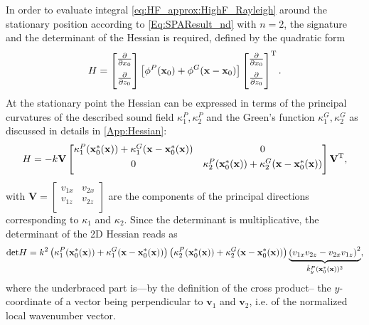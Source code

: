 In order to evaluate integral \eqref{eq:HF_approx:HighF_Rayleigh} around the stationary position according to \eqref{Eq:SPAResult_nd} with $n=2$, the signature and the determinant of the Hessian is required, defined by the quadratic form
\begin{equation}
H =
\begin{bmatrix} 
\frac{\partial}{\partial x_0}\\[.7em]
\frac{\partial}{\partial z_0}\\[0.5em] \end{bmatrix} 
\left[ \phi^P(\mathbf{x}_0) + \phi^G(\mathbf{x}-\mathbf{x}_0)  \right]
\begin{bmatrix} 
\frac{\partial}{\partial x_0}\\[.7em]
\frac{\partial}{\partial z_0} \\[0.5em] \end{bmatrix}^{\mathrm{T}}.
\end{equation}
At the stationary point the Hessian can be expressed in terms of the principal curvatures of the described sound field $\kappa_1^P, \kappa_2^P$ and the Green's function $\kappa_1^G, \kappa_2^G$ as discussed in details in \ref{App:Hessian}:
\begin{equation}
H = -k
\mathbf{V}
\begin{bmatrix} 
\kappa_1^P(\mathbf{x}_0^*(\mathbf{x})) + \kappa_1^G(\mathbf{x}-\mathbf{x}_0^*(\mathbf{x})) & 0 \\[.3em]
0 & \kappa_2^P(\mathbf{x}_0^*(\mathbf{x})) + \kappa_2^G(\mathbf{x}-\mathbf{x}_0^*(\mathbf{x})) \\[.5em] \end{bmatrix}
\mathbf{V}^{\mathrm{T}},
\end{equation}
with $\mathbf{V} = \begin{bmatrix} 
v_{1 x} & v_{2 x} \\[.1em]
v_{1 z} & v_{2 z}\\[.3em] \end{bmatrix}$ are the components of the principal directions corresponding to $\kappa_1$ and $\kappa_2$.
Since the determinant is multiplicative, the determinant of the 2D Hessian reads as
\begin{equation}
\mathrm{det} H = k^2
\left(\kappa_1^P(\mathbf{x}_0^*(\mathbf{x})) + \kappa_1^G(\mathbf{x}-\mathbf{x}_0^*(\mathbf{x}))\right)
\left(\kappa_2^P(\mathbf{x}_0^*(\mathbf{x})) + \kappa_2^G(\mathbf{x}-\mathbf{x}_0^*(\mathbf{x}))\right)
\underbrace{\left( v_{1 x}v_{2 z}-v_{2 x}v_{1 z} \right)^2}_{\hat{k}_y^P(\mathbf{x}_0^*(\mathbf{x}))^2},
\end{equation}
where the underbraced part is---by the definition of the cross product-- the $y$-coordinate of a vector being perpendicular to $\mathbf{v}_1$ and $\mathbf{v}_2$, i.e. of the normalized local wavenumber vector.

